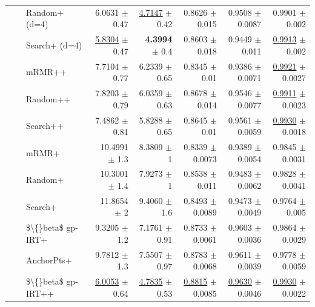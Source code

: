 \begin{longtable}{llp{}rrrrr}
 &  & Random+ (d=4) & 6.0631 {\scriptsize $\pm$ 0.47} & \underline{4.7147} {\scriptsize $\pm$ 0.42} & 0.8626 {\scriptsize $\pm$ 0.015} & 0.9508 {\scriptsize $\pm$ 0.0087} & 0.9901 {\scriptsize $\pm$ 0.002} \\
 &  & Search+ (d=4) & \underline{5.8304} {\scriptsize $\pm$ 0.47} & \textbf{4.3994} {\scriptsize $\pm$ 0.4} & 0.8603 {\scriptsize $\pm$ 0.018} & 0.9449 {\scriptsize $\pm$ 0.011} & \underline{0.9913} {\scriptsize $\pm$ 0.002} \\
 &  & mRMR++ & 7.7104 {\scriptsize $\pm$ 0.77} & 6.2339 {\scriptsize $\pm$ 0.65} & 0.8345 {\scriptsize $\pm$ 0.01} & 0.9386 {\scriptsize $\pm$ 0.0071} & \underline{0.9921} {\scriptsize $\pm$ 0.0027} \\
 &  & Random++ & 7.8203 {\scriptsize $\pm$ 0.79} & 6.0359 {\scriptsize $\pm$ 0.63} & 0.8678 {\scriptsize $\pm$ 0.014} & 0.9546 {\scriptsize $\pm$ 0.0077} & \underline{0.9911} {\scriptsize $\pm$ 0.0023} \\
 &  & Search++ & 7.4862 {\scriptsize $\pm$ 0.81} & 5.8288 {\scriptsize $\pm$ 0.65} & 0.8645 {\scriptsize $\pm$ 0.01} & 0.9561 {\scriptsize $\pm$ 0.0059} & \underline{0.9930} {\scriptsize $\pm$ 0.0018} \\
 &  & mRMR+ & 10.4991 {\scriptsize $\pm$ 1.3} & 8.3809 {\scriptsize $\pm$ 1} & 0.8339 {\scriptsize $\pm$ 0.0073} & 0.9389 {\scriptsize $\pm$ 0.0054} & 0.9845 {\scriptsize $\pm$ 0.0031} \\
 &  & Random+ & 10.3001 {\scriptsize $\pm$ 1.4} & 7.9273 {\scriptsize $\pm$ 1} & 0.8538 {\scriptsize $\pm$ 0.011} & 0.9483 {\scriptsize $\pm$ 0.0062} & 0.9828 {\scriptsize $\pm$ 0.0041} \\
 &  & Search+ & 11.8654 {\scriptsize $\pm$ 2} & 9.4060 {\scriptsize $\pm$ 1.6} & 0.8493 {\scriptsize $\pm$ 0.0089} & 0.9473 {\scriptsize $\pm$ 0.0049} & 0.9764 {\scriptsize $\pm$ 0.005} \\
 &  & \$\textbackslash\{\}beta\$ gp-IRT+ & 9.3205 {\scriptsize $\pm$ 1.2} & 7.1761 {\scriptsize $\pm$ 0.91} & 0.8733 {\scriptsize $\pm$ 0.0061} & 0.9603 {\scriptsize $\pm$ 0.0036} & 0.9864 {\scriptsize $\pm$ 0.0029} \\
 &  & AnchorPts+ & 9.7812 {\scriptsize $\pm$ 1.3} & 7.5507 {\scriptsize $\pm$ 0.97} & 0.8783 {\scriptsize $\pm$ 0.0068} & 0.9611 {\scriptsize $\pm$ 0.0039} & 0.9778 {\scriptsize $\pm$ 0.0059} \\
 &  & \$\textbackslash\{\}beta\$ gp-IRT++ & \underline{6.0053} {\scriptsize $\pm$ 0.64} & \underline{4.7835} {\scriptsize $\pm$ 0.53} & \underline{0.8815} {\scriptsize $\pm$ 0.0085} & \underline{0.9630} {\scriptsize $\pm$ 0.0046} & \underline{0.9930} {\scriptsize $\pm$ 0.0022} \\

\end{longtable}
